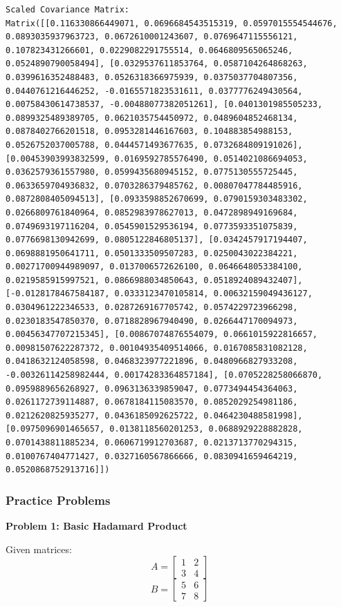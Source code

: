 \documentclass[
  letterpaper,
  DIV=11,
  numbers=noendperiod]{scrreprt}
\theoremstyle{plain}
\theoremstyle{definition}
\theoremstyle{remark}
\begin{document}
\begin{verbatim}
Scaled Covariance Matrix:
Matrix([[0.116330866449071, 0.0696684543515319, 0.0597015554544676, 0.0893035937963723, 0.0672610001243607, 0.0769647115556121, 0.107823431266601, 0.0229082291755514, 0.0646809565065246, 0.0524890790058494], [0.0329537611853764, 0.0587104264868263, 0.0399616352488483, 0.0526318366975939, 0.0375037704807356, 0.0440761216446252, -0.0165571823531611, 0.0377776249430564, 0.00758430614738537, -0.00488077382051261], [0.0401301985505233, 0.0899325489389705, 0.0621035754450972, 0.0489604852468134, 0.0878402766201518, 0.0953281446167603, 0.104883854988153, 0.0526752037005788, 0.0444571493677635, 0.0732684809191026], [0.00453903993832599, 0.0169592785576490, 0.0514021086694053, 0.0362579361557980, 0.0599435680945152, 0.0775130555725445, 0.0633659704936832, 0.0703286379485762, 0.00807047784485916, 0.0872808405094513], [0.0933598852670699, 0.0790159303483302, 0.0266809761840964, 0.0852983978627013, 0.0472898949169684, 0.0749693197116204, 0.0545901529536194, 0.0773593351075839, 0.0776698130942699, 0.0805122846805137], [0.0342457917194407, 0.0698881950641711, 0.0501333509507283, 0.0250043022384221, 0.00271700944989097, 0.0137006572626100, 0.0646648053384100, 0.0219585915997521, 0.0866988034850643, 0.0518924089432407], [-0.0128178467584187, 0.0333123470105814, 0.00632159049436127, 0.0304961222346533, 0.0287269167705742, 0.0574229723966298, 0.0230183547850370, 0.0718828967940490, 0.0266447170094973, 0.00456347707215345], [0.00867074876554079, 0.0661015922816657, 0.00981507622287372, 0.00104935409514066, 0.0167085831082128, 0.0418632124058598, 0.0468323977221896, 0.0480966827933208, -0.00326114258982444, 0.00174283364857184], [0.0705228258066870, 0.0959889656268927, 0.0963136339859047, 0.0773494454364063, 0.0261172739114887, 0.0678184115083570, 0.0852029254981186, 0.0212620825935277, 0.0436185092625722, 0.0464230488581998], [0.0975096901465657, 0.0138118560201253, 0.0688929228882828, 0.0701438811885234, 0.0606719912703687, 0.0213713770294315, 0.0100767404771427, 0.0327160567866666, 0.0830941659464219, 0.0520868752913716]])
\end{verbatim}

\subsubsection{Practice Problems}\label{practice-problems-1}

\textbf{Problem 1: Basic Hadamard Product}

Given matrices: \[A=\begin{bmatrix}1&2\\3&4\end{bmatrix}\]
\[B=\begin{bmatrix}5&6\\7&8\end{bmatrix}\]
\end{document}
